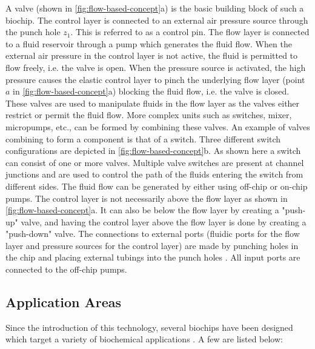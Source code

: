 A valve (shown in \autoref{fig:flow-based-concept}a) is the basic building block of such a biochip. The control layer is connected to an external air pressure source through the punch hole $z_1$. This is referred to as a control pin. The flow layer is connected to a fluid reservoir through a pump which generates the fluid flow. When the external air pressure in the control layer is not active, the fluid is permitted to flow freely, i.e. the valve is open. When the pressure source is activated, the high pressure causes the elastic control layer to pinch the underlying flow layer (point $a$ in \autoref{fig:flow-based-concept}a) blocking the fluid flow, i.e. the valve is closed. These valves are used to manipulate fluids in the flow layer as the valves either restrict or permit the fluid flow. More complex units such as switches, mixer, micropumps, etc., can be formed by combining these valves. An example of valves combining to form a component is that of a switch. Three different switch configurations are depicted in \autoref{fig:flow-based-concept}b. As shown here a switch can consist of one or more valves. Multiple valve switches are present at channel junctions and are used to control the path of the fluids entering the switch from different sides. The fluid flow can be generated by either using off-chip or on-chip pumps. The control layer is not necessarily above the flow layer as shown in \autoref{fig:flow-based-concept}a. It can also be below the flow layer by creating a "push-up" valve, and having the control layer above the flow layer is done by creating a "push-down" valve. The connections to external ports (fluidic ports for the flow layer and pressure sources for the control layer) are made by punching holes in the chip and placing external tubings into the punch holes \cite{integration-microfluidics}. All input ports are connected to the off-chip pumps.

\subsection{Application Areas}
Since the introduction of this technology, several biochips have been designed which target a variety of biochemical applications \cite{life-sciences-microfluidics}. A few are listed below:

